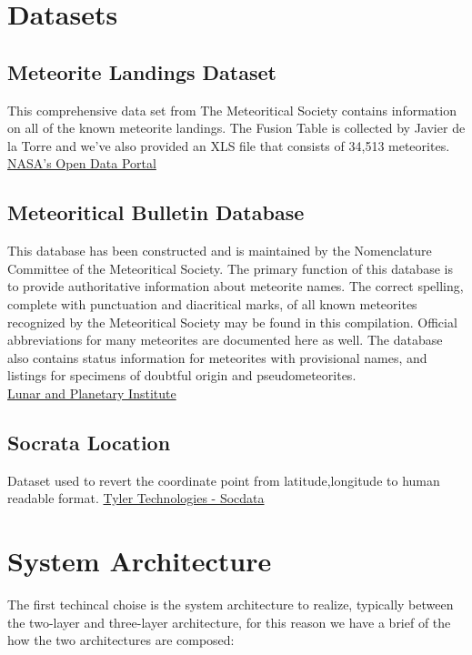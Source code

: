 \documentclass[conference]{IEEEtran}
\begin{document}
	\section{Datasets}
	
	\subsection{Meteorite Landings Dataset}
	This comprehensive data set from The Meteoritical Society contains information on all of the known meteorite landings. The Fusion Table is collected by Javier de la Torre and we've also provided an XLS file that consists of 34,513 meteorites. \\
	\href{https://data.nasa.gov/Space-Science/Meteorite-Landings/gh4g-9sfh/about_data}{NASA's Open Data Portal}
	
	\subsection{Meteoritical Bulletin Database}
	This database has been constructed and is maintained by the Nomenclature Committee of the Meteoritical Society. The primary function of this database is to provide authoritative information about meteorite names. The correct spelling, complete with punctuation and diacritical marks, of all known meteorites recognized by the Meteoritical Society may be found in this compilation. Official abbreviations for many meteorites are documented here as well. The database also contains status information for meteorites with provisional names, and listings for specimens of doubtful origin and pseudometeorites. \\
	\href{https://www.lpi.usra.edu/meteor/}{Lunar and Planetary Institute}
	
	\subsection{Socrata Location}
	Dataset used to revert the coordinate point from latitude,longitude to human readable format.
	\href{https://dev.socrata.com/docs/datatypes/location.html#}{Tyler Technologies - Socdata}
	
	\section{System Architecture}
	The first techincal choise is the system architecture to realize, typically between the two-layer and three-layer architecture, for this reason we have a brief of the how the two architectures are composed:
	
\end{document}
